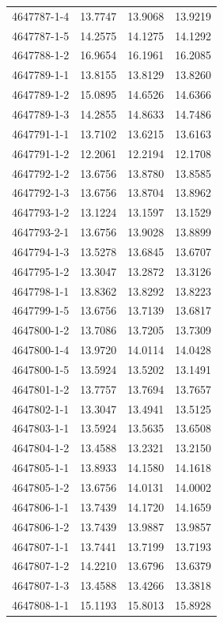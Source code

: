 \begin{longtable}{lrrr}
4647787-1-4 & 13.7747 & 13.9068 & 13.9219 \\
4647787-1-5 & 14.2575 & 14.1275 & 14.1292 \\
4647788-1-2 & 16.9654 & 16.1961 & 16.2085 \\
4647789-1-1 & 13.8155 & 13.8129 & 13.8260 \\
4647789-1-2 & 15.0895 & 14.6526 & 14.6366 \\
4647789-1-3 & 14.2855 & 14.8633 & 14.7486 \\
4647791-1-1 & 13.7102 & 13.6215 & 13.6163 \\
4647791-1-2 & 12.2061 & 12.2194 & 12.1708 \\
4647792-1-2 & 13.6756 & 13.8780 & 13.8585 \\
4647792-1-3 & 13.6756 & 13.8704 & 13.8962 \\
4647793-1-2 & 13.1224 & 13.1597 & 13.1529 \\
4647793-2-1 & 13.6756 & 13.9028 & 13.8899 \\
4647794-1-3 & 13.5278 & 13.6845 & 13.6707 \\
4647795-1-2 & 13.3047 & 13.2872 & 13.3126 \\
4647798-1-1 & 13.8362 & 13.8292 & 13.8223 \\
4647799-1-5 & 13.6756 & 13.7139 & 13.6817 \\
4647800-1-2 & 13.7086 & 13.7205 & 13.7309 \\
4647800-1-4 & 13.9720 & 14.0114 & 14.0428 \\
4647800-1-5 & 13.5924 & 13.5202 & 13.1491 \\
4647801-1-2 & 13.7757 & 13.7694 & 13.7657 \\
4647802-1-1 & 13.3047 & 13.4941 & 13.5125 \\
4647803-1-1 & 13.5924 & 13.5635 & 13.6508 \\
4647804-1-2 & 13.4588 & 13.2321 & 13.2150 \\
4647805-1-1 & 13.8933 & 14.1580 & 14.1618 \\
4647805-1-2 & 13.6756 & 14.0131 & 14.0002 \\
4647806-1-1 & 13.7439 & 14.1720 & 14.1659 \\
4647806-1-2 & 13.7439 & 13.9887 & 13.9857 \\
4647807-1-1 & 13.7441 & 13.7199 & 13.7193 \\
4647807-1-2 & 14.2210 & 13.6796 & 13.6379 \\
4647807-1-3 & 13.4588 & 13.4266 & 13.3818 \\
4647808-1-1 & 15.1193 & 15.8013 & 15.8928 \\

\end{longtable}
